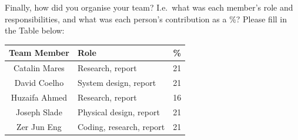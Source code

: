 \documentclass[hidelinks,a4paper,11pt]{article}
\begin{document}
Finally, how did you organise your team?  I.e.\ what was each member's role and responsibilities,
and what was each person's contribution as a \%?  Please fill in the Table below:
\begin{center}
	\begin{tabular}{ | c | p{8cm} | c | } \hline
		 \bf{Team Member} & \bf{Role} & \% \\ \hline
         Catalin Mares & Research, report & 21 \\ \hline
         David Coelho & System design, report & 21 \\ \hline
		Huzaifa Ahmed & Research, report & 16 \\ \hline
        Joseph Slade & Physical design, report & 21 \\ \hline
		Zer Jun Eng & Coding, research, report & 21 \\ \hline

	\end{tabular}
\end{center}
\end{document}
